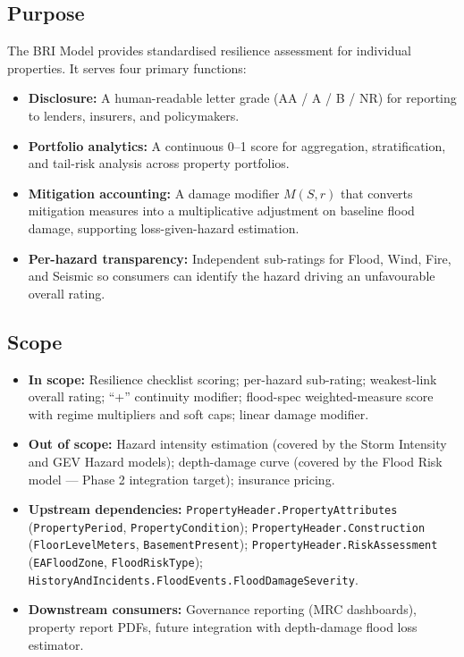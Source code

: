\documentclass[11pt,a4paper]{article}
\begin{document}
\mkmpurpose

\subsection{Purpose}
The BRI Model provides standardised resilience assessment for individual properties.
It serves four primary functions:
\begin{itemize}[nosep]
    \item \textbf{Disclosure:} A human-readable letter grade (AA / A / B / NR) for
          reporting to lenders, insurers, and policymakers.
    \item \textbf{Portfolio analytics:} A continuous 0--1 score for aggregation,
          stratification, and tail-risk analysis across property portfolios.
    \item \textbf{Mitigation accounting:} A damage modifier $M(S, r)$ that converts
          mitigation measures into a multiplicative adjustment on baseline flood
          damage, supporting loss-given-hazard estimation.
    \item \textbf{Per-hazard transparency:} Independent sub-ratings for Flood, Wind,
          Fire, and Seismic so consumers can identify the hazard driving an
          unfavourable overall rating.
\end{itemize}

\subsection{Scope}
\begin{itemize}[nosep]
    \item \textbf{In scope:} Resilience checklist scoring; per-hazard sub-rating;
          weakest-link overall rating; ``+'' continuity modifier; flood-spec
          weighted-measure score with regime multipliers and soft caps; linear damage
          modifier.
    \item \textbf{Out of scope:} Hazard intensity estimation (covered by the Storm
          Intensity and GEV Hazard models); depth-damage curve (covered by the Flood
          Risk model --- Phase 2 integration target); insurance pricing.
    \item \textbf{Upstream dependencies:}
          \texttt{PropertyHeader.PropertyAttributes}
          (\texttt{PropertyPeriod}, \texttt{PropertyCondition});
          \texttt{PropertyHeader.Construction}
          (\texttt{FloorLevelMeters}, \texttt{BasementPresent});
          \texttt{PropertyHeader.RiskAssessment}
          (\texttt{EAFloodZone}, \texttt{FloodRiskType});
          \texttt{HistoryAndIncidents.FloodEvents.FloodDamageSeverity}.
    \item \textbf{Downstream consumers:} Governance reporting (MRC dashboards),
          property report PDFs, future integration with depth-damage flood loss
          estimator.
\end{itemize}
\end{document}
